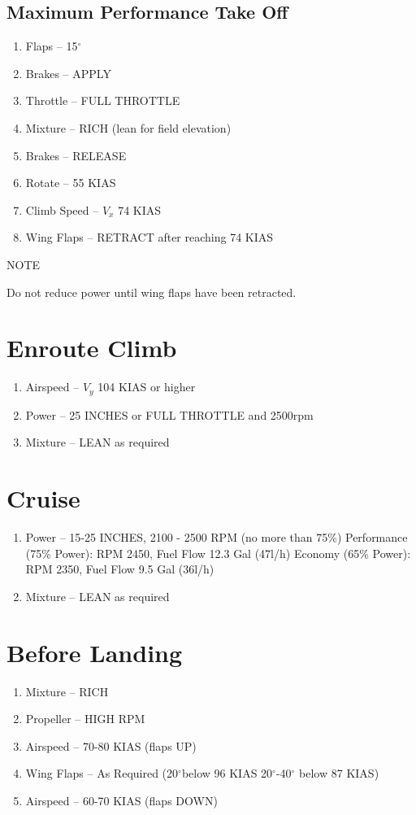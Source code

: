 \subsection{Maximum Performance Take Off}
\begin{enumerate}[(1)]
  \item Flaps -- 15$^{\circ}$
  \item Brakes -- APPLY
  \item Throttle -- FULL THROTTLE  
  \item Mixture -- RICH (lean for field elevation)
  \item Brakes -- RELEASE
  \item Rotate -- 55 KIAS
  \item Climb Speed -- $V_x$ 74 KIAS 
  \item Wing Flaps -- RETRACT after reaching 74 KIAS
\end{enumerate}
\begin{center}
NOTE

Do not reduce power until wing flaps have been retracted.
\end{center}

\section{Enroute Climb}
\begin{enumerate}[(1)]
  \item Airspeed -- $V_y$ 104 KIAS or higher
  \item Power -- 25 INCHES or FULL THROTTLE and 2500rpm 
  \item Mixture -- LEAN as required
\end{enumerate}

\section{Cruise}
\begin{enumerate}[(1)]
\item Power -- 15-25 INCHES, 2100 - 2500 RPM (no more than 75\%)
\subitem Performance (75\% Power): RPM 2450, Fuel Flow 12.3 Gal (47l/h) %
\subitem Economy (65\% Power): RPM 2350, Fuel Flow 9.5 Gal (36l/h) %
\item Mixture -- LEAN as required
\end{enumerate}

\section{Before Landing}
\begin{enumerate}[(1)]
\item Mixture -- RICH
\item Propeller -- HIGH RPM
\item Airspeed -- 70-80 KIAS (flaps UP)
\item Wing Flaps -- As Required (20$^{\circ}$below 96 KIAS 20$^{\circ}$-40$^{\circ}$ below 87 KIAS)
\item Airspeed -- 60-70 KIAS (flaps DOWN)
\end{enumerate}

